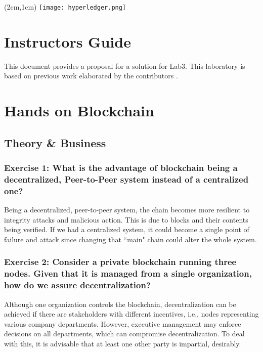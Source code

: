 \documentclass[12pt,a4paper]{article}
\begin{document}
\textblockorigin{-34pt}{-12pt}
\begin{textblock*}{10cm}(2cm,1cm)
\texttt{[image: hyperledger.png]}
\end{textblock*}

\section*{Instructors Guide}
This document provides a proposal for a solution for Lab3. This laboratory is based on previous work elaborated by the contributors \cite{belchior2019_audits,belchior2020,belchior2019_thesis}.

\section{Hands on Blockchain}
\subsection{Theory \& Business}

\subsubsection*{Exercise 1: What is the advantage of blockchain being a decentralized, Peer-to-Peer system instead of a centralized one?}

Being a decentralized, peer-to-peer system, the chain becomes more resilient to integrity attacks and malicious action. This is due to blocks and their contents being verified.  If we had a centralized system, it could become a single point of failure and attack since changing that ``main" chain could alter the whole system.

\subsubsection*{Exercise 2: Consider a private blockchain running three nodes. Given that it is managed from a single organization, how do we assure decentralization?}

Although one organization controls the blockchain, decentralization can be achieved if there are stakeholders with different incentives, i.e., nodes representing various company departments. However, executive management may enforce decisions on all departments, which can compromise decentralization. To deal with this, it is advisable that at least one other party is impartial, desirably.
\end{document}
